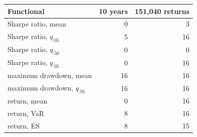 \begin{tabular}{lrr}
\toprule
Functional & 10 years & 151{,}040 returns \\
\midrule
Sharpe ratio, mean & 0 & 3 \\
Sharpe ratio, $q_{.05}$ & 5 & 16 \\
Sharpe ratio, $q_{.50}$ & 0 & 0 \\
Sharpe ratio, $q_{.95}$ & 0 & 16 \\
maximum drawdown, mean & 16 & 16 \\
maximum drawdown, $q_{.95}$ & 16 & 16 \\
return, mean & 0 & 16 \\
return, VaR & 8 & 16 \\
return, ES & 8 & 15 \\
\bottomrule
\end{tabular}

